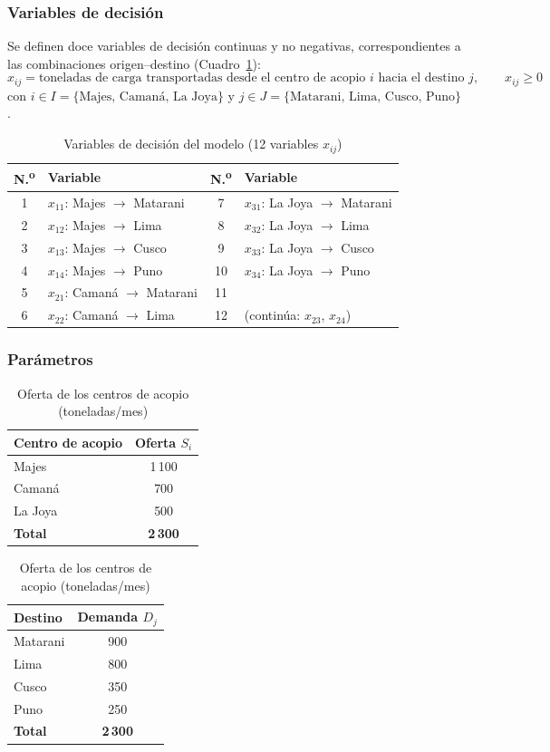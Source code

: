 \documentclass[11pt,a4paper]{article}
\begin{document}
\subsubsection{Variables de decisi\'on}
Se definen doce variables de decisi\'on continuas y no negativas, correspondientes a las combinaciones origen--destino (Cuadro~\ref{tab:variables}):
\[
x_{ij} = \text{toneladas de carga transportadas desde el centro de acopio } i \text{ hacia el destino } j, \qquad x_{ij}\ge 0
\]
con $i \in I = \{\text{Majes, Caman\'a, La Joya}\}$ y $j \in J = \{\text{Matarani, Lima, Cusco, Puno}\}$.

\begin{table}[h]
\centering
\caption{Variables de decisi\'on del modelo (12 variables $x_{ij}$)}
\label{tab:variables}
\begin{tabular}{clcl}
\toprule
\textbf{N.\textsuperscript{o}} & \textbf{Variable} & \textbf{N.\textsuperscript{o}} & \textbf{Variable}\\
\midrule
1 & $x_{11}$: Majes $\to$ Matarani & 7 & $x_{31}$: La Joya $\to$ Matarani \\
2 & $x_{12}$: Majes $\to$ Lima & 8 & $x_{32}$: La Joya $\to$ Lima \\
3 & $x_{13}$: Majes $\to$ Cusco & 9 & $x_{33}$: La Joya $\to$ Cusco \\
4 & $x_{14}$: Majes $\to$ Puno & 10 & $x_{34}$: La Joya $\to$ Puno \\
5 & $x_{21}$: Caman\'a $\to$ Matarani & 11 & \\
6 & $x_{22}$: Caman\'a $\to$ Lima & 12 & (contin\'ua: $x_{23}$, $x_{24}$) \\
\bottomrule
\end{tabular}
\end{table}

\subsubsection{Par\'ametros}
\begin{table}[h]
\centering
\caption{Oferta de los centros de acopio (toneladas/mes)}
\begin{tabular}{lc}
\toprule
Centro de acopio & Oferta $S_i$\\
\midrule
Majes & 1\,100 \\
Caman\'a & 700 \\
La Joya & 500 \\
\midrule
\textbf{Total} & \textbf{2\,300} \\
\bottomrule
\end{tabular}
\quad
\begin{tabular}{lc}
\toprule
Destino & Demanda $D_j$\\
\midrule
Matarani & 900 \\
Lima & 800 \\
Cusco & 350 \\
Puno & 250 \\
\midrule
\textbf{Total} & \textbf{2\,300} \\
\bottomrule
\end{tabular}
\end{table}
\end{document}
